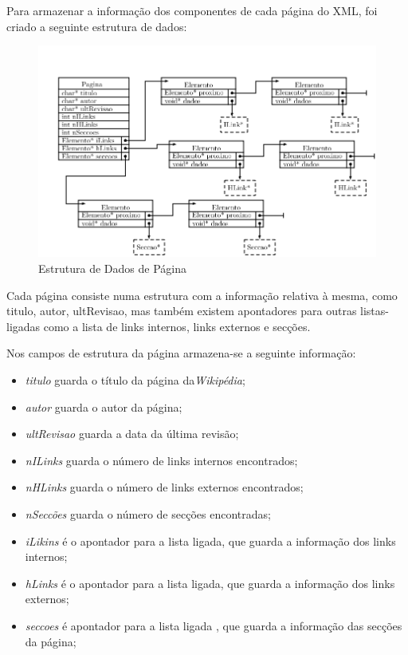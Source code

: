 \documentclass[11pt, a4paper, oneside]{article}
\begin{document}
Para armazenar a informação dos componentes de cada página do XML, foi criado a seguinte estrutura de dados: \\
\begin{figure}[h]
\begin{center}
\includegraphics[width=0.9\linewidth]{pagina}
\caption{Estrutura de Dados de Página}
\end{center}
\end{figure}

Cada página consiste numa estrutura com a informação relativa à mesma, como titulo, autor, ultRevisao, mas também existem apontadores para outras listas-ligadas como a lista de links internos, links externos e secções.


Nos campos de estrutura da página armazena-se a seguinte informação:
\begin{itemize}

\item \textit{titulo} guarda o título da página da\textit{Wikipédia};
\item \textit{autor} guarda o autor da página;
\item \textit{ultRevisao} guarda a data da última revisão;
\item \textit{nILinks} guarda o número de links internos encontrados;
\item \textit{nHLinks} guarda o número de links externos encontrados;
\item \textit{nSeccões} guarda o número de secções encontradas;
\item \textit{iLikins} é o apontador para a lista ligada, que guarda a informação dos links internos;
\item \textit{hLinks} é o apontador para a lista ligada, que guarda a informação dos links externos;
\item \textit{seccoes} é apontador para a lista ligada , que guarda a informação das secções da página;



\newpage
\end{itemize}
\end{document}
